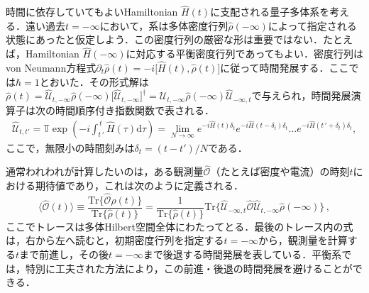 \documentclass[a4paper,11pt]{ltjsarticle}
\def\Tr{\mathrm{Tr}}
\begin{document}
時間に依存していてもよいHamiltonian $\hat{H}(t)$に支配される量子多体系を考える．遠い過去$t=-\infty$において，系は多体密度行列$\hat{\rho}(-\infty)$によって指定される状態にあったと仮定しよう．この密度行列の厳密な形は重要ではない．たとえば，Hamiltonian $\hat{H}(-\infty)$に対応する平衡密度行列であってもよい．密度行列はvon Neumann方程式$\partial_{t}\hat{\rho}(t)=-i\big[\hat{H}(t),\hat{\rho}(t)\big]$に従って時間発展する．ここでは$\hbar=1$とおいた．その形式解は$\hat{\rho}(t)=\hat{\mathcal{U}}_{t,-\infty}\hat{\rho}(-\infty)
\big[\hat{\mathcal{U}}_{t,-\infty}\big]^{\dag}=
\hat{\mathcal{U}}_{t,-\infty}\hat{\rho}(-\infty)
\hat{\mathcal{U}}_{-\infty,t}$で与えられ，時間発展演算子は次の時間順序付き指数関数で表される．
\begin{eqnarray}
\hat{\mathcal{U}}_{t,t'}=\mathbb{T}\exp\left(-i\int^{\,t}_{t\,'}
\hat{H}(\tau)\mathrm{d}\tau\right)=\lim_{N\rightarrow\infty}
e^{-i\hat{H}(t)\delta_{t}}e^{-i\hat{H}(t-\delta_{t})\delta_{t}}\ldots
e^{-i\hat{H}(t\,'+\delta_{t})\delta_{t}},
\end{eqnarray}ここで，無限小の時間刻みは$\delta_{t}=(t-t')/N$である．


通常われわれが計算したいのは，ある観測量$\hat{\mathcal{O}}$（たとえば密度や電流）の時刻$t$における期待値であり，これは次のように定義される．
\begin{equation}\label{contour-O-average}
\big\langle\hat{\mathcal{O}}(t)\big\rangle\equiv
\frac{\Tr\{\hat{\mathcal{O}}\hat{\rho}(t)\}}
{\Tr\{\hat{\rho}(t)\}}=\frac{1}{\Tr\{\hat{\rho}(t)\}}
\Tr\big\{\hat{\mathcal{U}}_{-\infty,t}\hat{\mathcal{O}}
\hat{\mathcal{U}}_{t,-\infty}\hat{\rho}(-\infty)\big\}\,,
\end{equation}ここでトレースは多体Hilbert空間全体にわたってとる．最後のトレース内の式は，右から左へ読むと，初期密度行列を指定する$t=-\infty$から，観測量を計算する$t$まで前進し，その後$t=-\infty$まで後退する時間発展を表している．平衡系では，特別に工夫された方法により，この前進・後退の時間発展を避けることができる．
\end{document}
